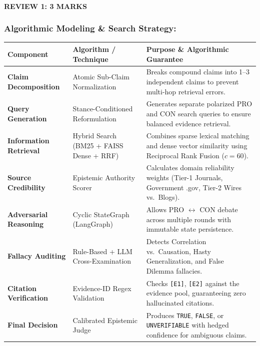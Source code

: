 \documentclass[aspectratio=169, 10pt]{beamer}
\begin{document}
\begin{frame}
    \framesubtitle{REVIEW 1: 3 MARKS}
    \frametitle{Algorithmic Modeling \& Search Strategy:}
    \vspace{-0.15cm}
    \setlength{\tabcolsep}{4pt}
    \renewcommand{\arraystretch}{1.10}
    \scriptsize
    \noindent
    \begin{tabularx}{\textwidth}{l p{3.8cm} >{\raggedright\arraybackslash}X}
        \toprule
        \rowcolor{HeaderBg}
        \textbf{Component} & \textbf{Algorithm / Technique} & \textbf{Purpose \& Algorithmic Guarantee} \\
        \midrule
        \textbf{Claim Decomposition} & Atomic Sub-Claim Normalization & Breaks compound claims into 1--3 independent claims to prevent multi-hop retrieval errors. \\
        \rowcolor{RowAlt}
        \textbf{Query Generation} & Stance-Conditioned Reformulation & Generates separate polarized PRO and CON search queries to ensure balanced evidence retrieval. \\
        \textbf{Information Retrieval} & Hybrid Search (BM25 + FAISS Dense + RRF) & Combines sparse lexical matching and dense vector similarity using Reciprocal Rank Fusion ($c=60$). \\
        \rowcolor{RowAlt}
        \textbf{Source Credibility} & Epistemic Authority Scorer & Calculates domain reliability weights (Tier-1 Journals, Government .gov, Tier-2 Wires vs.\ Blogs). \\
        \textbf{Adversarial Reasoning} & Cyclic StateGraph (LangGraph) & Allows PRO $\longleftrightarrow$ CON debate across multiple rounds with immutable state persistence. \\
        \rowcolor{RowAlt}
        \textbf{Fallacy Auditing} & Rule-Based + LLM Cross-Examination & Detects Correlation vs.\ Causation, Hasty Generalization, and False Dilemma fallacies. \\
        \textbf{Citation Verification} & Evidence-ID Regex Validation & Checks \texttt{[E1]}, \texttt{[E2]} against the evidence pool, guaranteeing zero hallucinated citations. \\
        \rowcolor{RowAlt}
        \textbf{Final Decision} & Calibrated Epistemic Judge & Produces \texttt{TRUE}, \texttt{FALSE}, or \texttt{UNVERIFIABLE} with hedged confidence for ambiguous claims. \\
        \bottomrule
    \end{tabularx}
\end{frame}
\end{document}
